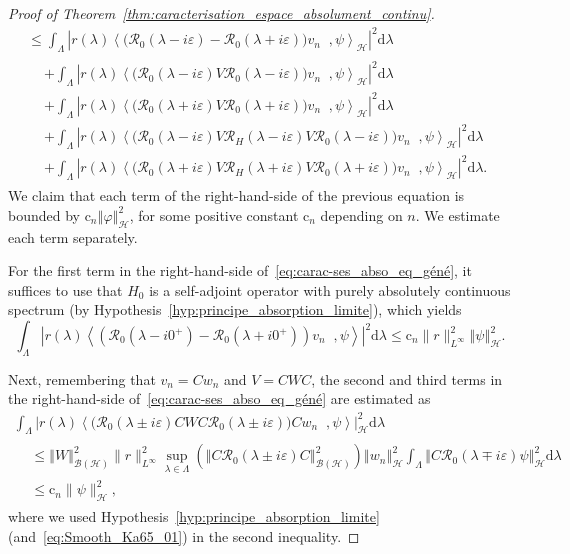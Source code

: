 \documentclass[AHL,Unicode,longabstracts,published]{cedram}
\newcommand{\Hi}{\mathcal{H}}
\newcommand{\rmc}{\mathrm{c}}
\newcommand{\rmd}{\mathrm{d}}
\newcommand{\norme}[1]{\left\Vert #1\right\Vert}
\newcommand{\scal}[2]{\left\langle{#1} \middle., {#2}\right\rangle}
\newcommand{\abso}[1]{\left|{#1}\right|}
\newcommand{\Res}{\mathcal{R}}
\newcommand{\clB}{\mathcal{B}}
\newcommand{\Hi}{\mathcal{H}}
\begin{document}
\begin{proof}[Proof of Theorem~\ref{thm:caracterisation_espace_absolument_continu}]
\begin{multline}
\leq\int_{\Lambda}\abso{r(\lambda)\scal{\big(\Res_0(\lambda-i\varepsilon)-\Res_0(\lambda+i\varepsilon)\big)v_n}{\psi}_\Hi}^2\rmd \lambda\\
\begin{aligned}
&+\int_{\Lambda}\abso{r(\lambda)\scal{\big(\Res_0(\lambda-i\varepsilon)V\Res_0(\lambda-i\varepsilon)\big)v_n}{\psi}_\Hi}^2\rmd \lambda\\
&+\int_{\Lambda}\abso{r(\lambda)\scal{\big(\Res_0(\lambda+i\varepsilon)V\Res_0(\lambda+i\varepsilon)\big)v_n}{\psi}_\Hi}^2\rmd \lambda\\
&+\int_{\Lambda}\abso{r(\lambda)\scal{\big(\Res_0(\lambda-i\varepsilon)V\Res_H(\lambda-i\varepsilon)V\Res_0(\lambda-i\varepsilon)\big)v_n}{\psi}_\Hi}^2\rmd \lambda\\
&+\int_{\Lambda}\abso{r(\lambda)\scal{\big(\Res_0(\lambda+i\varepsilon)V\Res_H(\lambda+i\varepsilon)V\Res_0(\lambda+i\varepsilon)\big)v_n}{\psi}_\Hi}^2\rmd \lambda.
\end{aligned}
\end{multline}
We claim that each term of the right-hand-side of the previous equation is bounded by $\rmc_n\norme{\varphi}_\Hi^2$, for some positive constant $\rmc_n$ depending on $n$. We estimate each term separately.

For the first term in the right-hand-side of~\eqref{eq:carac-ses_abso_eq_géné}, it suffices to use that $H_0$ is a self-adjoint operator with purely absolutely continuous spectrum (by Hypothesis~\ref{hyp:principe_absorption_limite}), which yields
\begin{equation}\label{eq:carac_ses_abso_H_0}
\int_{\Lambda}\abso{r(\lambda)\scal{\left(\Res_0\left(\lambda-i0^+\right)-\Res_0\left(\lambda+i0^+\right)\right)v_n}{\psi}}^2\rmd \lambda\leq \rmc_n\|r\|^2_{L^\infty}\norme{\psi}_\Hi^2.
\end{equation}

Next, remembering that $v_n=Cw_n$ and $V=CWC$, the second and third terms in the right-hand-side of~\eqref{eq:carac-ses_abso_eq_géné} are estimated as
\begin{multline}\label{eq:t2}
\int_{\Lambda}\abso{r(\lambda)\scal{\big(\Res_0(\lambda\pm i\varepsilon)CWC\Res_0(\lambda\pm i\varepsilon)\big)Cw_n}{\psi}}_\Hi^2\rmd \lambda \\
\begin{aligned}
&\leq\norme{W}_{\clB(\Hi)}^2\|r\|_{L^\infty}^2\sup_{\lambda\in\Lambda}\left(\norme{C\Res_0(\lambda\pm i\varepsilon)C}_{\clB(\Hi)}^2\right)\norme{w_n}^2_{\Hi}\int_{\Lambda}\norme{C\Res_0(\lambda\mp i\varepsilon)\psi}^2_\Hi\rmd \lambda \\
&\leq \rmc_n\|\psi\|^2_\Hi, 
\end{aligned}
\end{multline}
where we used Hypothesis~\ref{hyp:principe_absorption_limite} (and~\eqref{eq:Smooth_Ka65_01}) in the second inequality.


\end{proof}
\end{document}
